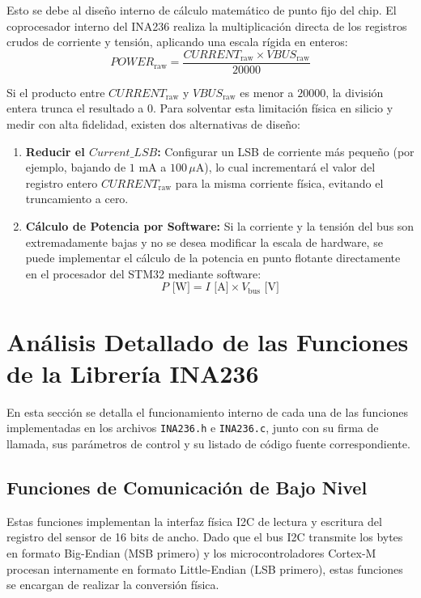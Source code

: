 \documentclass[
10pt, %
a4paper, %
oneside, %
headinclude,footinclude, %
BCOR5mm, %
]{scrartcl}
\begin{document}
Esto se debe al diseño interno de cálculo matemático de punto fijo del chip. El coprocesador interno del INA236 realiza la multiplicación directa de los registros crudos de corriente y tensión, aplicando una escala rígida en enteros:
\begin{equation}
	POWER_{\text{raw}} = \frac{CURRENT_{\text{raw}} \times VBUS_{\text{raw}}}{20000}
\end{equation}

Si el producto entre $CURRENT_{\text{raw}}$ y $VBUS_{\text{raw}}$ es menor a $20000$, la división entera trunca el resultado a $0$. Para solventar esta limitación física en silicio y medir con alta fidelidad, existen dos alternativas de diseño:
\begin{enumerate}
	\item \textbf{Reducir el $Current\_LSB$:} Configurar un LSB de corriente más pequeño (por ejemplo, bajando de $1\text{ mA}$ a $100\,\mu\text{A}$), lo cual incrementará el valor del registro entero $CURRENT_{\text{raw}}$ para la misma corriente física, evitando el truncamiento a cero.
	\item \textbf{Cálculo de Potencia por Software:} Si la corriente y la tensión del bus son extremadamente bajas y no se desea modificar la escala de hardware, se puede implementar el cálculo de la potencia en punto flotante directamente en el procesador del STM32 mediante software:
	\begin{equation}
		P\text{ [W]} = I\text{ [A]} \times V_{\text{bus}}\text{ [V]}
	\end{equation}
\end{enumerate}

\newpage
\section{Análisis Detallado de las Funciones de la Librería INA236}

En esta sección se detalla el funcionamiento interno de cada una de las funciones implementadas en los archivos \texttt{INA236.h} e \texttt{INA236.c}, junto con su firma de llamada, sus parámetros de control y su listado de código fuente correspondiente.

\subsection{Funciones de Comunicación de Bajo Nivel}
Estas funciones implementan la interfaz física I2C de lectura y escritura del registro del sensor de 16 bits de ancho. Dado que el bus I2C transmite los bytes en formato Big-Endian (MSB primero) y los microcontroladores Cortex-M procesan internamente en formato Little-Endian (LSB primero), estas funciones se encargan de realizar la conversión física.
\end{document}
